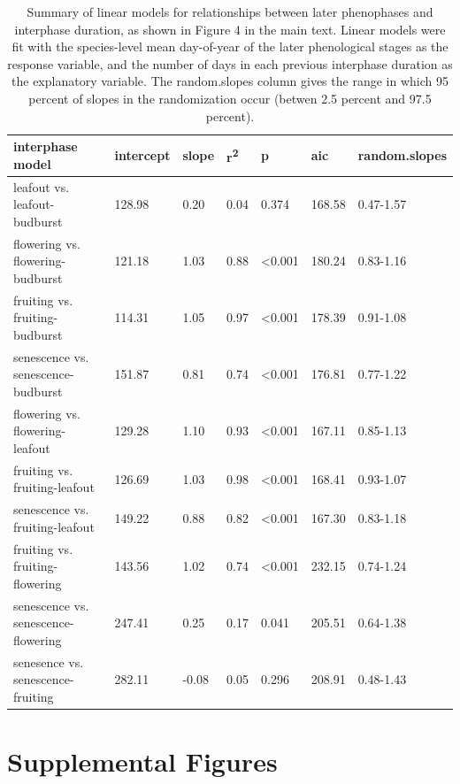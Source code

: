 \documentclass{article}
\begin{document}
\begin{table}[ht]
\centering
\caption{Summary of linear models for relationships between later phenophases and interphase duration, as shown in Figure 4 in the main text. Linear models were fit with the species-level mean day-of-year of the later phenological stages as the response variable, and the number of days in each previous interphase duration as the explanatory variable. The random.slopes column gives the range in which 95 percent of slopes in the randomization occur (betwen 2.5 percent and 97.5 percent).} 
\label{table:interphase}
\begin{tabular}{|p{}|p{}|p{}|p{}|p{}|p{}|p{}|}
  \hline
interphase model & intercept & slope & r\textsuperscript{2} & p & aic & random.slopes \\ 
  \hline
leafout vs. leafout-budburst & 128.98 & 0.20 & 0.04 & 0.374 & 168.58 & 0.47-1.57 \\ 
  flowering vs. flowering-budburst & 121.18 & 1.03 & 0.88 & <0.001 & 180.24 & 0.83-1.16 \\ 
  fruiting vs. fruiting-budburst & 114.31 & 1.05 & 0.97 & <0.001 & 178.39 & 0.91-1.08 \\ 
  senescence vs. senescence-budburst & 151.87 & 0.81 & 0.74 & <0.001 & 176.81 & 0.77-1.22 \\ 
  flowering vs. flowering-leafout & 129.28 & 1.10 & 0.93 & <0.001 & 167.11 & 0.85-1.13 \\ 
  fruiting vs. fruiting-leafout & 126.69 & 1.03 & 0.98 & <0.001 & 168.41 & 0.93-1.07 \\ 
  senescence vs. fruiting-leafout & 149.22 & 0.88 & 0.82 & <0.001 & 167.30 & 0.83-1.18 \\ 
  fruiting vs. fruiting-flowering & 143.56 & 1.02 & 0.74 & <0.001 & 232.15 & 0.74-1.24 \\ 
  senescence vs. senescence-flowering & 247.41 & 0.25 & 0.17 & 0.041 & 205.51 & 0.64-1.38 \\ 
  senesence vs. senescence-fruiting & 282.11 & -0.08 & 0.05 & 0.296 & 208.91 & 0.48-1.43 \\ 
   \hline
\end{tabular}
\end{table}\clearpage

\section* {Supplemental Figures}
\end{document}

